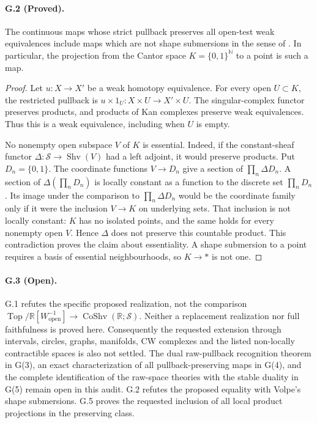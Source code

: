 \paragraph{G.2 (Proved).}
The continuous maps whose strict pullback preserves all open-test weak
equivalences include maps which are not shape submersions in the sense
of \citet[Definition 3.23]{GHIJVolpe2025}. In particular, the projection from the
Cantor space $K=\{0,1\}^{\mathbb N}$ to a point is such a map.
\begin{proof}
Let $u:X\to X'$ be a weak homotopy equivalence. For every open
$U\subset K$, the restricted pullback is $u\times1_U:X\times U\to
X'\times U$. The singular-complex functor preserves products, and
products of Kan complexes preserve weak equivalences. Thus this is a
weak equivalence, including when $U$ is empty.

No nonempty open subspace $V$ of $K$ is essential. Indeed, if the
constant-sheaf functor $\Delta:\mathcal S\to\operatorname{Shv}(V)$
had a left adjoint, it would preserve products. Put $D_n=\{0,1\}$.
The coordinate functions $V\to D_n$ give a section of
$\prod_n\Delta D_n$. A section of $\Delta(\prod_n D_n)$ is locally
constant as a function to the discrete set $\prod_nD_n$. Its image
under the comparison to $\prod_n\Delta D_n$ would be the coordinate
family only if it were the inclusion $V\to K$ on underlying sets.
That inclusion is not locally constant: $K$ has no isolated points,
and the same holds for every nonempty open $V$. Hence $\Delta$ does
not preserve this countable product. This contradiction proves the
claim about essentiality. A shape submersion to a point requires a
basis of essential neighbourhoods, so $K\to*$ is not one.
\end{proof}

\paragraph{G.3 (Open).}
G.1 refutes the specific proposed realization, not the comparison
$\operatorname{Top}/\mathbb R[W_{\mathrm{open}}^{-1}]
\to\operatorname{CoShv}(\mathbb R;\mathcal S)$.
Neither a replacement realization nor full faithfulness is proved
here. Consequently the requested extension through intervals,
circles, graphs, manifolds, CW complexes and the listed non-locally
contractible spaces is also not settled. The dual raw-pullback
recognition theorem in G(3), an exact characterization of all
pullback-preserving maps in G(4), and the complete identification
of the raw-space theories with the stable duality in G(5) remain
open in this audit. G.2 refutes the proposed equality with Volpe's
shape submersions. G.5 proves the requested inclusion of all
local product projections in the preserving class.

